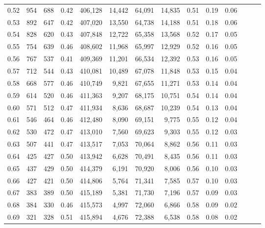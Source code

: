 \begin{tabular}{rrrrrrrrrrrrrr}
0.52 &     954 &    688 &  0.42 &  406,128 &   14,442 &  64,091 &  14,835 &  0.51 &  0.19 &      0.06 \\
0.53 &     892 &    647 &  0.42 &  407,020 &   13,550 &  64,738 &  14,188 &  0.51 &  0.18 &      0.06 \\
0.54 &     828 &    620 &  0.43 &  407,848 &   12,722 &  65,358 &  13,568 &  0.52 &  0.17 &      0.05 \\
0.55 &     754 &    639 &  0.46 &  408,602 &   11,968 &  65,997 &  12,929 &  0.52 &  0.16 &      0.05 \\
0.56 &     767 &    537 &  0.41 &  409,369 &   11,201 &  66,534 &  12,392 &  0.53 &  0.16 &      0.05 \\
0.57 &     712 &    544 &  0.43 &  410,081 &   10,489 &  67,078 &  11,848 &  0.53 &  0.15 &      0.04 \\
0.58 &     668 &    577 &  0.46 &  410,749 &    9,821 &  67,655 &  11,271 &  0.53 &  0.14 &      0.04 \\
0.59 &     614 &    520 &  0.46 &  411,363 &    9,207 &  68,175 &  10,751 &  0.54 &  0.14 &      0.04 \\
0.60 &     571 &    512 &  0.47 &  411,934 &    8,636 &  68,687 &  10,239 &  0.54 &  0.13 &      0.04 \\
0.61 &     546 &    464 &  0.46 &  412,480 &    8,090 &  69,151 &   9,775 &  0.55 &  0.12 &      0.04 \\
0.62 &     530 &    472 &  0.47 &  413,010 &    7,560 &  69,623 &   9,303 &  0.55 &  0.12 &      0.03 \\
0.63 &     507 &    441 &  0.47 &  413,517 &    7,053 &  70,064 &   8,862 &  0.56 &  0.11 &      0.03 \\
0.64 &     425 &    427 &  0.50 &  413,942 &    6,628 &  70,491 &   8,435 &  0.56 &  0.11 &      0.03 \\
0.65 &     437 &    429 &  0.50 &  414,379 &    6,191 &  70,920 &   8,006 &  0.56 &  0.10 &      0.03 \\
0.66 &     427 &    421 &  0.50 &  414,806 &    5,764 &  71,341 &   7,585 &  0.57 &  0.10 &      0.03 \\
0.67 &     383 &    389 &  0.50 &  415,189 &    5,381 &  71,730 &   7,196 &  0.57 &  0.09 &      0.03 \\
0.68 &     384 &    330 &  0.46 &  415,573 &    4,997 &  72,060 &   6,866 &  0.58 &  0.09 &      0.02 \\
0.69 &     321 &    328 &  0.51 &  415,894 &    4,676 &  72,388 &   6,538 &  0.58 &  0.08 &      0.02 \\

\end{tabular}
